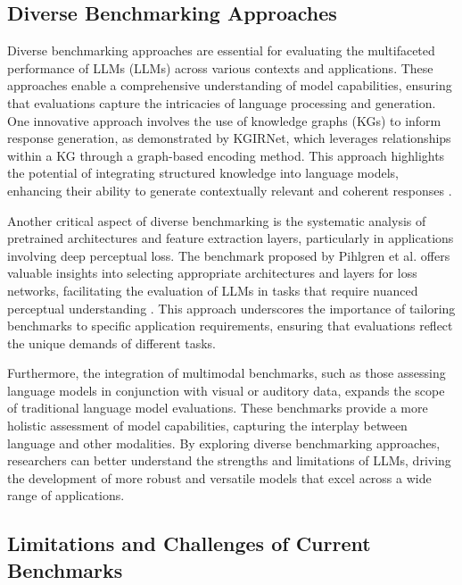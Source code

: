 \subsection{Diverse Benchmarking Approaches} \label{subsec:Diverse Benchmarking Approaches}



Diverse benchmarking approaches are essential for evaluating the multifaceted performance of LLMs (LLMs) across various contexts and applications. These approaches enable a comprehensive understanding of model capabilities, ensuring that evaluations capture the intricacies of language processing and generation. One innovative approach involves the use of knowledge graphs (KGs) to inform response generation, as demonstrated by KGIRNet, which leverages relationships within a KG through a graph-based encoding method. This approach highlights the potential of integrating structured knowledge into language models, enhancing their ability to generate contextually relevant and coherent responses \cite{chaudhuri2021groundingdialoguesystemsknowledge}.



Another critical aspect of diverse benchmarking is the systematic analysis of pretrained architectures and feature extraction layers, particularly in applications involving deep perceptual loss. The benchmark proposed by Pihlgren et al. offers valuable insights into selecting appropriate architectures and layers for loss networks, facilitating the evaluation of LLMs in tasks that require nuanced perceptual understanding \cite{pihlgren2024systematicperformanceanalysisdeep}. This approach underscores the importance of tailoring benchmarks to specific application requirements, ensuring that evaluations reflect the unique demands of different tasks.



Furthermore, the integration of multimodal benchmarks, such as those assessing language models in conjunction with visual or auditory data, expands the scope of traditional language model evaluations. These benchmarks provide a more holistic assessment of model capabilities, capturing the interplay between language and other modalities. By exploring diverse benchmarking approaches, researchers can better understand the strengths and limitations of LLMs, driving the development of more robust and versatile models that excel across a wide range of applications.



\subsection{Limitations and Challenges of Current Benchmarks} \label{subsec:Limitations and Challenges of Current Benchmarks}



